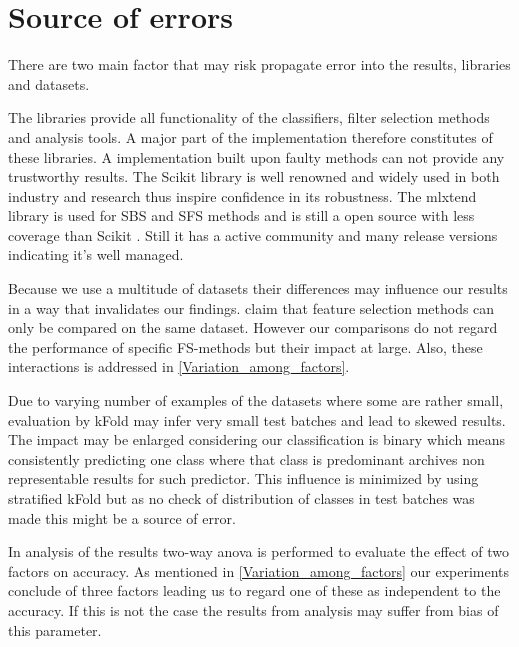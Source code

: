 \section{Source of errors}
\label{sec:source_of_errors}

There are two main factor that may risk propagate error into the results, libraries and datasets.

The libraries provide all functionality of the classifiers, filter selection methods and analysis tools. A major part of the implementation therefore constitutes of these libraries. A implementation built upon faulty methods can not provide any trustworthy results. The Scikit library \parencite{scikit-learn} is well renowned and widely used in both industry and research thus inspire confidence in its robustness. The mlxtend library is used for SBS and SFS methods and is still a open source with less coverage than Scikit \parencite{mlextend}. Still it has a active community and many release versions indicating it's well managed.

Because we use a multitude of datasets their differences may influence our results in a way that invalidates our findings. \textcite{c201416} claim that feature selection methods can only be compared on the same dataset. However our comparisons do not regard the performance of specific FS-methods but their impact at large. Also, these interactions is addressed in \ref{Variation_among_factors}.

Due to varying number of examples of the datasets where some are rather small, evaluation by kFold may infer very small test batches and lead to skewed results. The impact may be enlarged considering our classification is binary which means consistently predicting one class where that class is predominant archives non representable results for such predictor. This influence is minimized by using stratified kFold but as no check of distribution of classes in test batches was made this might be a source of error.

In analysis of the results two-way anova is performed to evaluate the effect of two factors on accuracy. As mentioned in \ref{Variation_among_factors} our experiments conclude of three factors leading us to regard one of these as independent to the accuracy. If this is not the case the results from analysis may suffer from bias of this parameter.
